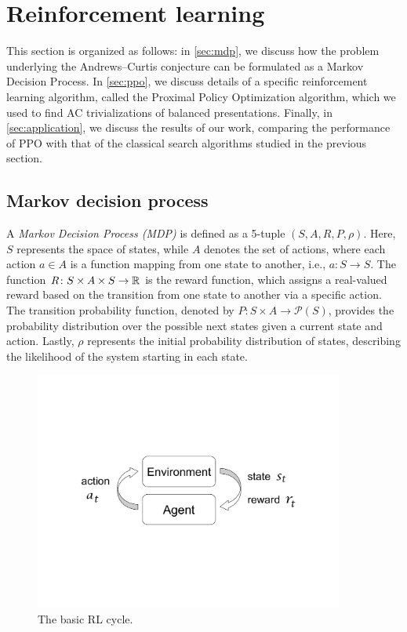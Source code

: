 
\section{Reinforcement learning}\label{sec:rl}


This section is organized as follows: in \autoref{sec:mdp}, we discuss how the problem underlying the Andrews--Curtis conjecture can be formulated as a Markov Decision Process.
In \autoref{sec:ppo}, we discuss details of a specific reinforcement learning algorithm, called the Proximal Policy Optimization algorithm, which we used to find AC trivializations of balanced presentations.
Finally, in \autoref{sec:application}, we discuss the results of our work, comparing the performance of PPO with that of the classical search algorithms studied in the previous section.

\subsection{Markov decision process} \label{sec:mdp}

A \textit{Markov Decision Process (MDP)} is defined as a 5-tuple $(S, A, R, P, \rho)$. Here, $S$ represents the space of states, while $A$ denotes the set of actions, where each action $a \in A$ is a function mapping from one state to another, i.e., $a \colon S \to S$. The function $R \colon S \times A \times S \to \mathbb{R}$ is the reward function, which assigns a real-valued reward based on the transition from one state to another via a specific action. The transition probability function, denoted by $P \colon S \times A \to \mathcal{P}(S)$, provides the probability distribution over the possible next states given a current state and action. Lastly, $\rho$ represents the initial probability distribution of states, describing the likelihood of the system starting in each state.

\begin{figure}[ht]
	\centering
	\includegraphics[trim={0.0in 3.0in 0.0in 2.5in},clip,width=4.0in]{fig/RLbasic.pdf}
	\caption{The basic RL cycle.}
	\label{fig:RLbasic}
\end{figure}

